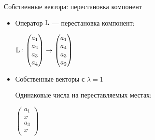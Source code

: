 \begin{frame}{Собственные вектора: перестановка компонент}

\begin{itemize}[<+->]
\item Оператор $\operatorname{L}$ — перестановка компонент:

$\operatorname{L} : \begin{pmatrix}
    a_1 \\
    a_2 \\
    a_3\\
    a_4 \\
\end{pmatrix} \to 
\begin{pmatrix}
    a_1 \\
    a_4 \\
    a_3\\
    a_2 \\
\end{pmatrix}$

\item Собственные векторы с $\lambda = 1$

Одинаковые числа на переставляемых местах:

$\begin{pmatrix}
    a_1 \\
    x \\
    a_3 \\
    x \\
\end{pmatrix}$

\end{itemize}

\end{frame}



